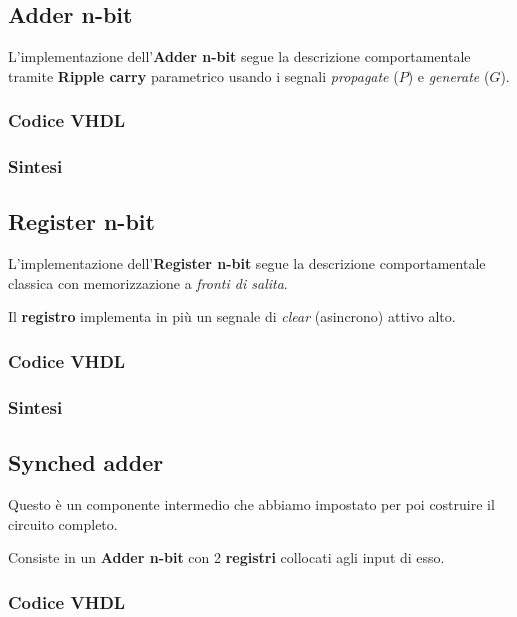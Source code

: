 \documentclass[12pt]{article}
\begin{document}
    \subsection{Adder n-bit}
        L'implementazione dell'\textbf{Adder n-bit} segue la descrizione comportamentale tramite \textbf{Ripple carry} parametrico usando i segnali \textit{propagate} ($P$) e \textit{generate} ($G$).

        \subsubsection{Codice VHDL}
            
        \subsubsection{Sintesi}

    \subsection{Register n-bit}
        L'implementazione dell'\textbf{Register n-bit} segue la descrizione comportamentale classica con memorizzazione a \textit{fronti di salita}.
        
        Il \textbf{registro} implementa in più un segnale di \textit{clear} (asincrono) attivo alto.

        \subsubsection{Codice VHDL}
            
        \subsubsection{Sintesi}

    \subsection{Synched adder}
        Questo è un componente intermedio che abbiamo impostato per poi costruire il circuito completo.

        Consiste in un \textbf{Adder n-bit} con 2 \textbf{registri} collocati agli input di esso.

        \subsubsection{Codice VHDL}
        
\end{document}
